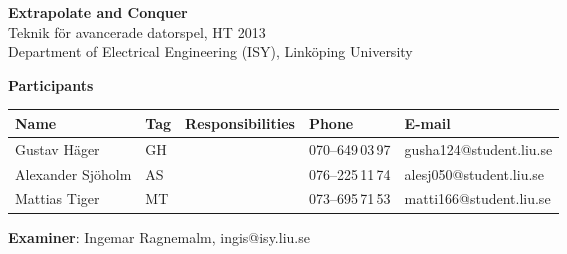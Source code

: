 \begin{center}
    \vspace*{4\baselineskip}

	\textbf{\huge Extrapolate and Conquer} \\
	\vspace*{0.5\baselineskip}
	Teknik för avancerade datorspel, HT 2013 \\
	Department of Electrical Engineering (ISY), Linköping University
	
	\vspace*{2\baselineskip}
	\textbf{\LARGE Participants}


	{\footnotesize 
	\begin{tabular}{|p{2.7cm}|p{1cm}|p{5cm}|p{2cm}|p{3.4cm}|}
		\hline
		\textbf{Name} & \textbf{Tag} & \textbf{Responsibilities} & \textbf{Phone} & \textbf{E-mail} \\
		\hline
		Gustav Häger & GH &  & 070--649\,03\,97 & gusha124@student.liu.se \\
		\hline
		Alexander Sjöholm & AS &  & 076--225\,11\,74 & alesj050@student.liu.se \\
		\hline
		Mattias Tiger & MT &  & 073--695\,71\,53 & matti166@student.liu.se \\
		\hline
	\end{tabular}
	}

{\footnotesize 
\vspace{0.5\baselineskip}
\vspace{1\baselineskip}

\textbf{Examiner}: Ingemar Ragnemalm, ingis@isy.liu.se \\
}

\end{center}
